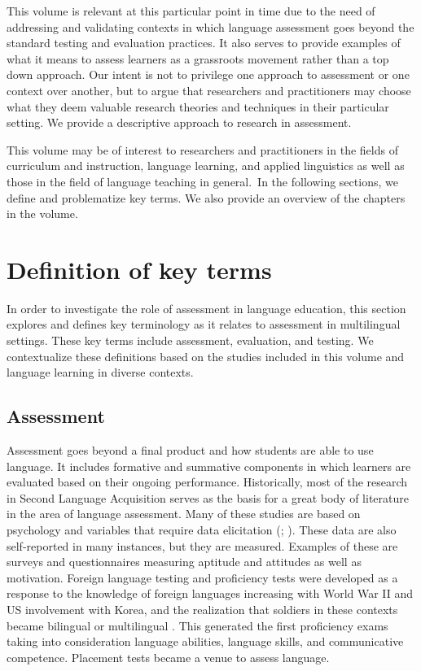 \documentclass[output=paper]{langscibook}
\begin{document}
This volume is relevant at this particular point in time due to the need of addressing and validating contexts in which language assessment goes beyond the standard testing and evaluation practices. It also serves to provide examples of what it means to assess learners as a grassroots movement rather than a top down approach. Our intent is not to privilege one approach to assessment or one context over another, but to argue that researchers and practitioners may choose what they deem valuable research theories and techniques in their particular setting. We provide a descriptive approach to research in assessment.



This volume may be of interest to researchers and practitioners in the fields of curriculum and instruction, language learning, and applied linguistics as well as those in the field of language teaching in general.~In the following sections, we define and problematize key terms. We also provide an overview of the chapters in the volume.



\section{Definition of key terms}



In order to investigate the role of assessment in language education, this section explores and defines key terminology as it relates to assessment in multilingual settings. These key terms include assessment, evaluation, and testing. We contextualize these definitions based on the studies included in this volume and language learning in diverse contexts.



\subsection{Assessment}



Assessment goes beyond a final product and how students are able to use language. It includes formative and summative components in which learners are evaluated based on their ongoing performance. Historically, most of the research in Second Language Acquisition serves as the basis for a great body of literature in the area of language assessment. Many of these studies are based on psychology and variables that require data elicitation (\citealt{Ortega2017}; \citealt{BrownBrown2017}). These data are also self-reported in many instances, but they are measured. Examples of these are surveys and questionnaires measuring aptitude and attitudes as well as motivation. Foreign language testing and proficiency tests were developed as a response to the knowledge of foreign languages increasing with World War II and US involvement with Korea, and the realization that soldiers in these contexts became bilingual or multilingual \citep{BrownBrown2017}. This generated the first proficiency exams taking into consideration language abilities, language skills, and communicative competence. Placement tests became a venue to assess language.
\end{document}
